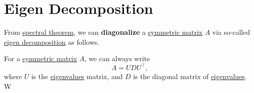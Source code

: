 
\newcommand*{\horzbar}{\rule[.5ex]{2.5ex}{0.5pt}}
\section{Eigen Decomposition}
From \hyperref[thm:spectral-theorem]{spectral theorem}, we can \textbf{diagonalize} a \hyperref[def:symmetric-matrix]{symmetric matrix} \(A\) via so-called \hyperref[thm:eigen-decomposition]{eigen decomposition} as follows.

\begin{theorem}\label{thm:eigen-decomposition}
	For a \hyperref[def:symmetric-matrix]{symmetric matrix} \(A\), we can always write
	\[
		A = U D U^{\top},
	\]
	where \(U\) is the \hyperref[def:eigenvalue]{eigenvalues} matrix, and \(D\) is the diagonal matrix of \hyperref[def:eigenvalue]{eigenvalues}. W
\end{theorem}
